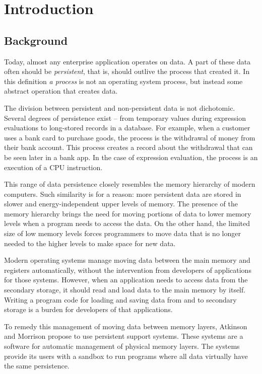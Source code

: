\chapter{Introduction}

\section{Background}
\label{sec:intro-bg}

Today, almost any enterprise application operates on data. A part of these data
often should be \textit{persistent}, that is, should outlive the process that
created it. In this definition \textit{a process} is not an operating system 
process, but instead some abstract operation that creates data. 

The division between persistent and non-persistent data is not dichotomic.
Several degrees of persistence exist -- from temporary values during expression
evaluations to long-stored records in a database. For example, when a customer
uses a bank card to purchase goods, the process is the withdrawal of money from
their bank account. This process creates a record about the withdrawal that can
be seen later in a bank app. In the case of expression evaluation, the process
is an execution of a CPU instruction. 

This range of data persistence closely resembles the memory hierarchy of modern
computers. Such similarity is for a reason: more persistent data are stored in
slower and energy-independent upper levels of memory. The presence of the
memory hierarchy brings the need for moving portions of data to lower memory
levels when a program needs to access the data. On the other hand, the limited
size of low memory levels forces programmers to move data that is no longer
needed to the higher levels to make space for new data.

Modern operating systems manage moving data between the main memory and
registers automatically, without the intervention from developers of
applications for those systems. However, when an application needs to access
data from the secondary storage, it should read and load data to the main
memory by itself. Writing a program code for loading and saving data from and to
secondary storage is a burden for developers of that applications.

To remedy this management of moving data between memory layers, Atkinson and
Morrison \cite{atkinson1995orthogonally} propose to use persistent support
systems. These systems are a software for automatic management of physical
memory layers. The systems provide its users with a sandbox to run programs
where all data virtually have the same persistence.

